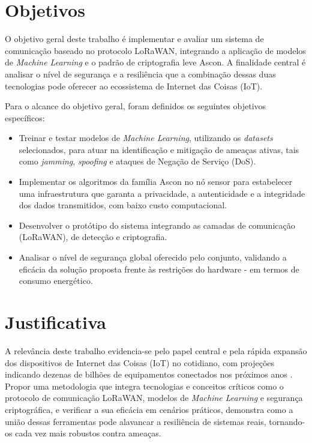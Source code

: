 
\section{Objetivos}
O objetivo geral deste trabalho é implementar e avaliar um sistema de comunicação baseado no protocolo LoRaWAN, integrando a aplicação de modelos de \textit{Machine Learning} e o padrão de criptografia leve Ascon. A finalidade central é analisar o nível de segurança e a resiliência que a combinação dessas duas tecnologias pode oferecer ao ecossistema de Internet das Coisas (IoT).

Para o alcance do objetivo geral, foram definidos os seguintes objetivos específicos:

\begin{itemize}
    \item Treinar e testar modelos de \textit{Machine Learning}, utilizando os \textit{datasets} selecionados, para atuar na identificação e mitigação de ameaças ativas, tais como \textit{jamming}, \textit{spoofing} e ataques de Negação de Serviço (DoS).
    \item Implementar os algoritmos da família Ascon no nó sensor para estabelecer uma infraestrutura que garanta a privacidade, a autenticidade e a integridade dos dados transmitidos, com baixo custo computacional.
    \item Desenvolver o protótipo do sistema integrando as camadas de comunicação (LoRaWAN), de detecção e criptografia.
    \item Analisar o nível de segurança global oferecido pelo conjunto, validando a eficácia da solução proposta frente às restrições do hardware - em termos de consumo energético.
\end{itemize}


\section{Justificativa}
A relevância deste trabalho evidencia-se pelo papel central e pela rápida expansão dos dispositivos de Internet das Coisas (IoT) no cotidiano, com projeções indicando dezenas de bilhões de equipamentos conectados nos próximos anos \cite{pandey2025}. Propor uma metodologia que integra tecnologias e conceitos críticos como o protocolo de comunicação LoRaWAN, modelos de \textit{Machine Learning} e segurança criptográfica, e verificar a sua eficácia em cenários práticos, demonstra como a união dessas ferramentas pode alavancar a resiliência de sistemas reais, tornando-os cada vez mais robustos contra ameaças.

